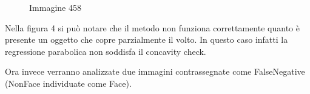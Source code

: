 \documentclass[
  italian,
]{article}
\begin{document}
\begin{figure}
\centering
{}%
\qquad
{}%
\qquad
{}%
\caption{Immagine 458}
\end{figure}
Nella figura 4 si può notare che il metodo non funziona correttamente quanto è presente un oggetto che copre parzialmente il volto.
In questo caso infatti la regressione parabolica non soddisfa il concavity check.

\pagebreak

Ora invece verranno analizzate due immagini contrassegnate come FalseNegative (NonFace individuate come Face).
\end{document}

